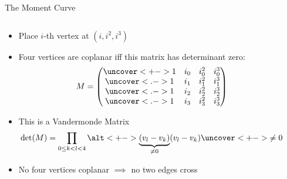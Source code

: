 \documentclass[t]{beamer}
\begin{document}
\begin{frame}{The Moment Curve}
    \vspace{-0.5cm}
    \begin{columns}
	\begin{column}{0.5\textwidth}
		\begin{itemize}
		    \item<+-> Place $i$-th vertex at $(i, i^2, i^3)$
		    \item<+-> Four vertices are coplanar iff this matrix has determinant zero:
			\begin{equation*}
			    M = \begin{pmatrix}
				\uncover<+->{1}&i_0&i_0^2&i_0^3\\
				\uncover<.->{1}&i_1&i_1^2&i_1^3\\
				\uncover<.->{1}&i_2&i_2^2&i_2^3\\
				\uncover<.->{1}&i_3&i_3^2&i_3^3\\
			    \end{pmatrix}
			\end{equation*}
		    \item<+-> This is a Vandermonde Matrix 
			\[\det(M) = \prod_{0 \le k < l < 4} \alt<+->{\underbrace{(v_l - v_k)}_{\neq 0}}{(v_l-v_k)} \uncover<+->{\neq 0}\]
		    \item<+-> No four vertices coplanar \linebreak $\implies$ no two edges cross
		\end{itemize}
	\end{column}
	    \begin{column}{0.5\textwidth}
		\begin{center}
		\end{center}
	    \end{column}
    \end{columns}
\end{frame}
\end{document}
